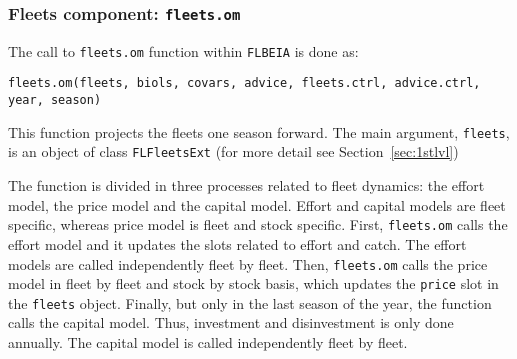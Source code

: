	
	\subsubsection{Fleets component: \texttt{fleets.om}}
		
		The call to \texttt{fleets.om} function within \texttt{FLBEIA} is done as:
		
		\begin{center}
			\texttt{fleets.om(fleets, biols, covars, advice, fleets.ctrl, advice.ctrl, year, season) }
		\end{center}

	This function projects the fleets one season forward. 
 	The main argument, \texttt{fleets}, is an object of class \texttt{FLFleetsExt} (for more detail see Section~\ref{sec:1stlvl})
	
	The function is divided in three processes related to fleet dynamics: the effort model, the price model and the capital model.
	Effort and capital models are fleet specific, whereas price model is fleet and stock specific.
	First, \texttt{fleets.om} calls the effort model and it updates the slots related to 
	effort and catch. The effort models are called independently fleet by fleet. Then, \texttt{fleets.om}
	calls the price model in fleet by fleet and stock by stock basis, which updates the \texttt{price} slot
	in the \texttt{fleets} object. Finally, but only in the last season of the year, the function calls the capital model. 
  Thus, investment and disinvestment is only done annually. 
	The capital model is called independently fleet by fleet. 
	

